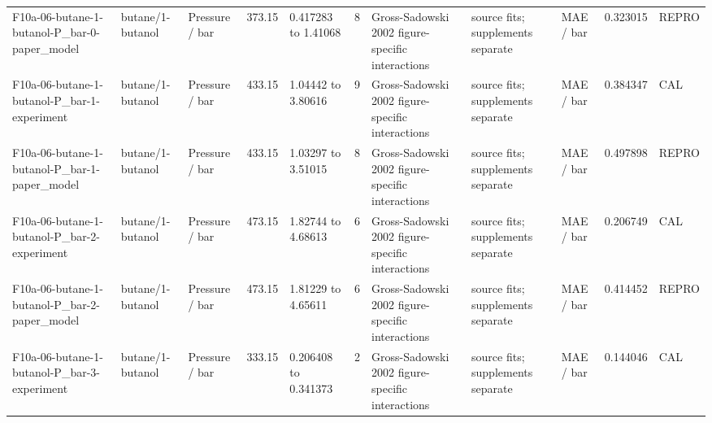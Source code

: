 \begin{landscape}
\begin{longtable}{L{1.9cm}L{2.5cm}L{2.1cm}L{1.6cm}L{1.6cm}rL{2.4cm}L{1.9cm}L{2.2cm}rL{1cm}}
F10a-\allowbreak{}06-\allowbreak{}butane-\allowbreak{}1-\allowbreak{}butanol-\allowbreak{}P\_\allowbreak{}bar-\allowbreak{}0-\allowbreak{}paper\_\allowbreak{}model & butane/\allowbreak{}1-\allowbreak{}butanol & Pressure /\allowbreak{} bar & 373.15 & 0.417283 to 1.41068 & 8 & Gross-\allowbreak{}Sadowski 2002 figure-\allowbreak{}specific interactions & source fits; supplements separate & MAE /\allowbreak{} bar & 0.323015 & REPRO \\
F10a-\allowbreak{}06-\allowbreak{}butane-\allowbreak{}1-\allowbreak{}butanol-\allowbreak{}P\_\allowbreak{}bar-\allowbreak{}1-\allowbreak{}experiment & butane/\allowbreak{}1-\allowbreak{}butanol & Pressure /\allowbreak{} bar & 433.15 & 1.04442 to 3.80616 & 9 & Gross-\allowbreak{}Sadowski 2002 figure-\allowbreak{}specific interactions & source fits; supplements separate & MAE /\allowbreak{} bar & 0.384347 & CAL \\
F10a-\allowbreak{}06-\allowbreak{}butane-\allowbreak{}1-\allowbreak{}butanol-\allowbreak{}P\_\allowbreak{}bar-\allowbreak{}1-\allowbreak{}paper\_\allowbreak{}model & butane/\allowbreak{}1-\allowbreak{}butanol & Pressure /\allowbreak{} bar & 433.15 & 1.03297 to 3.51015 & 8 & Gross-\allowbreak{}Sadowski 2002 figure-\allowbreak{}specific interactions & source fits; supplements separate & MAE /\allowbreak{} bar & 0.497898 & REPRO \\
F10a-\allowbreak{}06-\allowbreak{}butane-\allowbreak{}1-\allowbreak{}butanol-\allowbreak{}P\_\allowbreak{}bar-\allowbreak{}2-\allowbreak{}experiment & butane/\allowbreak{}1-\allowbreak{}butanol & Pressure /\allowbreak{} bar & 473.15 & 1.82744 to 4.68613 & 6 & Gross-\allowbreak{}Sadowski 2002 figure-\allowbreak{}specific interactions & source fits; supplements separate & MAE /\allowbreak{} bar & 0.206749 & CAL \\
F10a-\allowbreak{}06-\allowbreak{}butane-\allowbreak{}1-\allowbreak{}butanol-\allowbreak{}P\_\allowbreak{}bar-\allowbreak{}2-\allowbreak{}paper\_\allowbreak{}model & butane/\allowbreak{}1-\allowbreak{}butanol & Pressure /\allowbreak{} bar & 473.15 & 1.81229 to 4.65611 & 6 & Gross-\allowbreak{}Sadowski 2002 figure-\allowbreak{}specific interactions & source fits; supplements separate & MAE /\allowbreak{} bar & 0.414452 & REPRO \\
F10a-\allowbreak{}06-\allowbreak{}butane-\allowbreak{}1-\allowbreak{}butanol-\allowbreak{}P\_\allowbreak{}bar-\allowbreak{}3-\allowbreak{}experiment & butane/\allowbreak{}1-\allowbreak{}butanol & Pressure /\allowbreak{} bar & 333.15 & 0.206408 to 0.341373 & 2 & Gross-\allowbreak{}Sadowski 2002 figure-\allowbreak{}specific interactions & source fits; supplements separate & MAE /\allowbreak{} bar & 0.144046 & CAL \\

\end{longtable}
\end{landscape}
